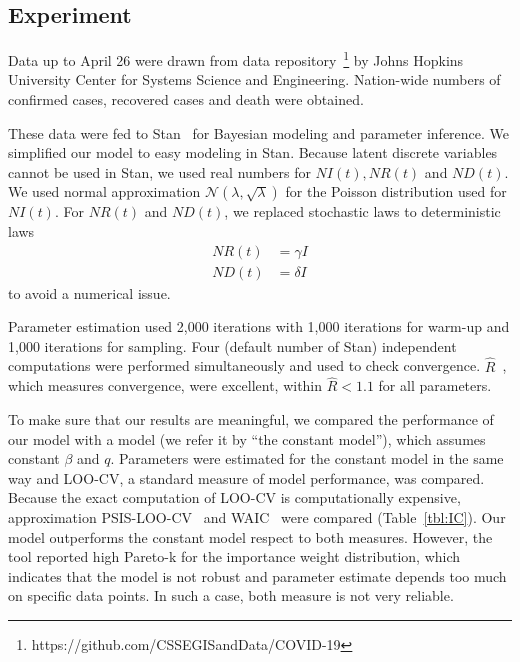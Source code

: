 \documentclass{amsart}
\begin{document}


\subsection{Experiment}

Data up to April 26 were drawn from data repository~\footnote{https://github.com/CSSEGISandData/COVID-19} by Johns Hopkins University Center for Systems Science and Engineering.
Nation-wide numbers of confirmed cases, recovered cases and death were obtained.

These data were fed to Stan~\cite{carpenter2017stan} for Bayesian modeling and parameter inference.
We simplified our model to easy modeling in Stan.
Because latent discrete variables cannot be used in Stan, we used real numbers for $NI(t), NR(t)$ and $ND(t)$.
We used normal approximation $\mathcal{N}(\lambda, \sqrt{\lambda})$ for the Poisson distribution used for $NI(t)$.
For $NR(t)$ and $ND(t)$, we replaced stochastic laws to deterministic laws
\begin{align}
 NR(t) &= \gamma I\\
 ND(t) &= \delta I
\end{align}
to avoid a numerical issue.

Parameter estimation used 2,000 iterations with 1,000 iterations for warm-up and 1,000 iterations for sampling.
Four (default number of Stan) independent computations were performed simultaneously and used to check convergence.
$\hat{R}$~\cite{vehtari2019rank}, which measures convergence, were excellent, within $\hat{R} < 1.1$ for all parameters. 

To make sure that our results are meaningful, we compared the performance of our model with a model (we refer it by ``the constant model''), which assumes constant $\beta$ and $q$.
Parameters were estimated for the constant model in the same way and LOO-CV, a standard measure of model performance, was compared.
Because the exact computation of LOO-CV is computationally expensive, approximation PSIS-LOO-CV~\cite{Vehtari2017} and WAIC~\cite{watanabe2010asymptotic} were compared (Table~\ref{tbl:IC}).
Our model outperforms the constant model respect to both measures.
However, the tool reported high Pareto-k for the importance weight distribution, which indicates that the model is not robust and parameter estimate depends too much on specific data points.
In such a case, both measure is not very reliable.
\end{document}

